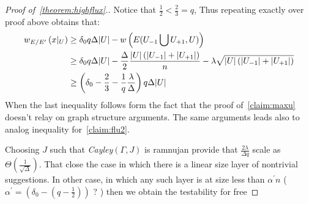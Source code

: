 \begin{proof}[Proof of~\cref{theorem:highflux}.] Notice that $\frac{1}{2} < \frac{2}{3} = q$, Thus repeating exactly over proof above obtains that: 
  \begin{equation*}
    \begin{split}
      w_{E/E^{\prime}}  \left( x|_{U} \right)  & \ge  \delta_{0}q\Delta|U|  - w\left( E(U_{-1} \bigcup U_{+1} ,U) \right)  \\ 
      & \ge   \delta_{0}q\Delta|U| - \frac{\Delta}{2} \frac{|U|\left( |U_{-1}| + |U_{+1}| \right)}{n} -\lambda\sqrt{|U|\left( |U_{-1}| + |U_{+1}| \right)} \\ 
      & \ge  \left( \delta_{0} - \frac{2}{3} - \frac{1}{q}\frac{\lambda}{\Delta} \right)q\Delta |U|
    \end{split}
  \end{equation*}
  When the last inequality follows form the fact that the proof of~\cref{claim:maxu} doesn't relay on graph structure arguments. The same arguments leads also to analog inequality for~\cref{claim:flu2}.

  Choosing $J$ such that \emph{Cayley}$\left( \Gamma, J \right)$ is ramnujan provide that $ \frac{2\lambda}{\Delta q}$ scale as $\Theta\left( \frac{1}{\sqrt{\Delta}} \right)$. That close the case in which there is a linear size layer of nontrivial suggestions. In other case, in which any such layer is at size less than $\alpha^{\prime}n$ ( $\alpha^{\prime} = \left( \delta_{0} - \left( q - \frac{1}{2} \right) \right)$ ? ) then we obtain the testability for free
\end{proof}



